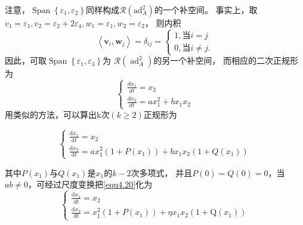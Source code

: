 注意，$\operatorname { Span } \left\{ \varepsilon _ { 1 } , \varepsilon _ { 2 } \right\}$同样构成$\mathscr { R } \left( \mathrm { ad } _ { A } ^ { 2 } \right)$的一个补空间。
事实上，取
$v _ { 1 } = \varepsilon _ { 1 } , v _ { 2 } = \varepsilon _ { 2 } + 2 \varepsilon _ { 4 } , w _ { 1 } = \varepsilon _ { 1 } , w _ { 2 } = \varepsilon _ { 2 }$，
则内积
\[
  \left\langle
    \boldsymbol { v } _ { i } , \boldsymbol { w } _ { j }
  \right\rangle
  = \delta _ { i j } =
  \left\{
    \begin{array} { l }
      { 1 },当i=j \\
      { 0 },当i\neq j.
    \end{array}
  \right.
\]
因此，可取$\operatorname { Span } \left\{ \varepsilon _ { 1 } , \varepsilon _ { 3 } \right\}$为
$\mathscr { R } \left( \operatorname { ad } _ { A } ^ { 2 } \right)$的另一个补空间，
而相应的二次正规形为
\begin{equation}
  \left\{
    \begin{array} { l }
      { \frac { d x _ { 1 } } { d t } = x _ { 2 } } \\
      { \frac { d x _ { 2 } } { d t } = a x _ { 1 } ^ { 2 } + b x _ { 1 } x _ { 2 } }
    \end{array}
  \right.
  \label{eq:1.4.19}
\end{equation}
用类似的方法，可以算出k次$( k \geqslant 2 )$正规形为

\begin{equation}
  \label{eq:1.4.20}
  \left\{
    \begin{array}{ l }
      { \frac { \mathrm { d } x _ { 1 } } { \mathrm { d } t } = x _ {2 } } \\
      { \frac { \mathrm { d } x _ { 2 } } { \mathrm { d } t } = a x _ { 1 } ^ { 2 } \left( 1 + P \left( x _ { 1 } \right) \right) + b x _ { 1 } x _ { 2 } \left( 1 + Q \left( x _ { 1 } \right) \right) }
    \end{array}
  \right.
\end{equation}

其中\(P(x_1)\)与\(Q(x_1)\)是\(x_1\)的\(k-2\)次多项式，
并且$P ( 0 ) = Q ( 0 )=0$，当$a b \neq 0$，可经过尺度变换把\ref{equ4.20}化为
\begin{equation}
  \left\{
    \begin{array} { l }
      { \frac { \mathrm { d } x _ { 1 } } { \mathrm { d } t } = x _ { 2 } } \\
      { \frac { \mathrm { d } x _ { 2 } } { \mathrm { d } t } = x _ { 1 } ^ { 2 } \left( 1 + P \left( x _ { 1 } \right) \right) + \eta x _ { 1 } x _ { 2 } \left( 1 + \mathrm { Q } \left( x _ { 1 } \right) \right) }
    \end{array}
  \right.
  \label{eq:1.4.21}
\end{equation}

